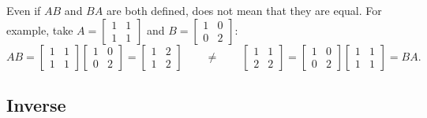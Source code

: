 \documentclass{ximera}
\begin{document}
Even if $AB$ and $BA$ are both defined, does not mean that they are equal. For example, take $A = \left[ \begin{smallmatrix} 1 & 1 \\ 1 & 1 \end{smallmatrix} \right]$ and $B = \left[ \begin{smallmatrix} 1 & 0 \\ 0 & 2 \end{smallmatrix} \right]$:
\begin{equation*}
    AB = 
    \begin{bmatrix} 
        1 & 1 \\ 
        1 & 1 
    \end{bmatrix}
    \begin{bmatrix} 
        1 & 0 \\ 
        0 & 2 
    \end{bmatrix}
    =
    \begin{bmatrix} 
        1 & 2 \\ 
        1 & 2 
    \end{bmatrix}
    \qquad \not = \qquad
    \begin{bmatrix} 
        1 & 1 \\ 
        2 & 2 
    \end{bmatrix}
    =
    \begin{bmatrix} 
        1 & 0 \\ 
        0 & 2 
    \end{bmatrix}
    \begin{bmatrix} 
        1 & 1 \\ 
        1 & 1 
    \end{bmatrix}
    = BA .
\end{equation*}

\subsection{Inverse}
\end{document}
